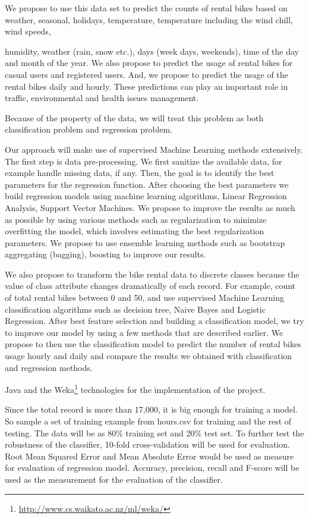 \documentclass[12pt]{article}
\newcommand{\bibfile}{GroupProject}
\newcommand{\ci}[1]{\cite{#1}}
\begin{document}
We propose to use this data set to predict the counts of rental bikes based on
weather, seasonal, holidays, temperature, temperature including the wind chill,
wind speeds,

humidity, weather (rain, snow etc.), days (week days, weekends), time of the
day and month of the year. We also propose to predict the usage of rental bikes
for casual users and registered users. And, we propose to predict the usage of
the rental bikes daily and hourly. These predictions can play an important role
in traffic, environmental and health issues management.

Because of the property of the data, we will treat this problem as both
classification problem and regression problem.

Our approach will make use of supervised Machine Learning methods
extensively. The first step is data pre-processing. We first sanitize the
available data, for example handle missing data, if any. Then, the goal is to
identify the best parameters for the regression function. After choosing the
best parameters we build regression models using machine learning algorithms,
Linear Regression Analysis, Support Vector Machines\ci{svm}. We propose to
improve the results as much as possible by using various methods such as
regularization to minimize overfitting the model, which involves estimating the
best regularization parameters. We propose to use ensemble learning methods
such as bootstrap aggregating (bagging), boosting to improve our results.

We also propose to transform the bike rental data to discrete classes because
the value of class attribute changes dramatically of each record. For example,
count of total rental bikes between 0 and 50, and use supervised Machine
Learning classification algorithms such as decision tree, Naive Bayes and
Logistic Regression\ci{logreg}. After best feature selection and building a
classification model, we try to improve our model by using a few methods that
are described earlier. We propose to then use the classification model to
predict the number of rental bikes usage hourly and daily and compare the
results we obtained with classification and regression methods.

Java and the
Weka\footnote{\href{http://www.cs.waikato.ac.nz/ml/weka/}{http://www.cs.waikato.ac.nz/ml/weka/}}
technologies for the implementation of the project.


Since the total record is more than 17,000, it is big enough for training a
model. So sample a set of training example from hours.csv for training and the
rest of testing. The data will be as 80\% training set and 20\% test set. To
further test the robustness of the classifier, 10-fold cross-validation will be
used for evaluation. Root Mean Squared Error and Mean Absolute Error would be
used as measure for evaluation of regression model\ci{modreg}. Accuracy,
precision, recall and F-score will be used as the measurement for the
evaluation of the classifier.\ci{liu2007web}



\end{document}
